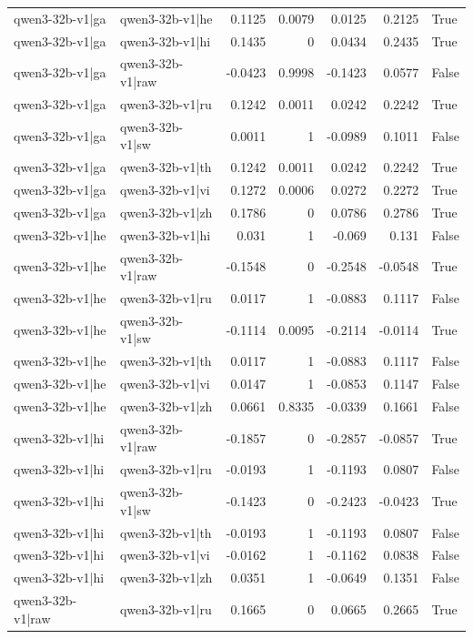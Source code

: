 \begin{table}
\begin{tabular}{l l r r r r l}
qwen3-32b-v1|ga & qwen3-32b-v1|he & 0.1125 & 0.0079 & 0.0125 & 0.2125 & True \\
qwen3-32b-v1|ga & qwen3-32b-v1|hi & 0.1435 & 0 & 0.0434 & 0.2435 & True \\
qwen3-32b-v1|ga & qwen3-32b-v1|raw & -0.0423 & 0.9998 & -0.1423 & 0.0577 & False \\
qwen3-32b-v1|ga & qwen3-32b-v1|ru & 0.1242 & 0.0011 & 0.0242 & 0.2242 & True \\
qwen3-32b-v1|ga & qwen3-32b-v1|sw & 0.0011 & 1 & -0.0989 & 0.1011 & False \\
qwen3-32b-v1|ga & qwen3-32b-v1|th & 0.1242 & 0.0011 & 0.0242 & 0.2242 & True \\
qwen3-32b-v1|ga & qwen3-32b-v1|vi & 0.1272 & 0.0006 & 0.0272 & 0.2272 & True \\
qwen3-32b-v1|ga & qwen3-32b-v1|zh & 0.1786 & 0 & 0.0786 & 0.2786 & True \\
qwen3-32b-v1|he & qwen3-32b-v1|hi & 0.031 & 1 & -0.069 & 0.131 & False \\
qwen3-32b-v1|he & qwen3-32b-v1|raw & -0.1548 & 0 & -0.2548 & -0.0548 & True \\
qwen3-32b-v1|he & qwen3-32b-v1|ru & 0.0117 & 1 & -0.0883 & 0.1117 & False \\
qwen3-32b-v1|he & qwen3-32b-v1|sw & -0.1114 & 0.0095 & -0.2114 & -0.0114 & True \\
qwen3-32b-v1|he & qwen3-32b-v1|th & 0.0117 & 1 & -0.0883 & 0.1117 & False \\
qwen3-32b-v1|he & qwen3-32b-v1|vi & 0.0147 & 1 & -0.0853 & 0.1147 & False \\
qwen3-32b-v1|he & qwen3-32b-v1|zh & 0.0661 & 0.8335 & -0.0339 & 0.1661 & False \\
qwen3-32b-v1|hi & qwen3-32b-v1|raw & -0.1857 & 0 & -0.2857 & -0.0857 & True \\
qwen3-32b-v1|hi & qwen3-32b-v1|ru & -0.0193 & 1 & -0.1193 & 0.0807 & False \\
qwen3-32b-v1|hi & qwen3-32b-v1|sw & -0.1423 & 0 & -0.2423 & -0.0423 & True \\
qwen3-32b-v1|hi & qwen3-32b-v1|th & -0.0193 & 1 & -0.1193 & 0.0807 & False \\
qwen3-32b-v1|hi & qwen3-32b-v1|vi & -0.0162 & 1 & -0.1162 & 0.0838 & False \\
qwen3-32b-v1|hi & qwen3-32b-v1|zh & 0.0351 & 1 & -0.0649 & 0.1351 & False \\
qwen3-32b-v1|raw & qwen3-32b-v1|ru & 0.1665 & 0 & 0.0665 & 0.2665 & True \\

\end{tabular}
\end{table}
